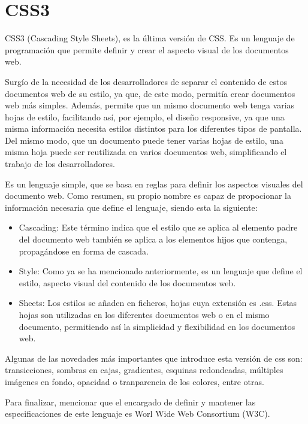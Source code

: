 \documentclass[a4paper, 12pt]{book}
\begin{document}
\section{CSS3} 
\label{sec:CSS3}

CSS3 (Cascading Style Sheets), es la última versión de CSS. Es un lenguaje de programación que permite definir y crear el aspecto visual de los documentos web. 

Surgío de la necesidad de los desarrolladores de separar el contenido de estos documentos web de su estilo, ya que, de este modo, permitía crear documentos web más simples. Además, permite que un mismo documento web tenga varias hojas de estilo, facilitando así, por ejemplo, el diseño responsive, ya que una misma información necesita estilos distintos para los diferentes tipos de pantalla. Del mismo modo, que un documento puede tener varias hojas de estilo, una misma hoja puede ser reutilizada en varios documentos web, simplificando el trabajo de los desarrolladores. 

Es un lenguaje simple, que se basa en reglas para definir los aspectos visuales del documento web. Como resumen, su propio nombre es capaz de propocionar la información necesaria que define el lenguaje, siendo esta la siguiente: 

\begin{itemize}
\item Cascading: Este término indica que el estilo que se aplica al elemento padre del documento web también se aplica a los elementos hijos que contenga, propagándose en forma de cascada. 
\item Style: Como ya se ha mencionado anteriormente, es un lenguaje que define el estilo, aspecto visual del contenido de los documentos web. 
\item Sheets: Los estilos se añaden en ficheros, hojas cuya extensión es .css. Estas hojas son utilizadas en los diferentes documentos web o en el mismo documento, permitiendo así la simplicidad y flexibilidad en los documentos web. 

\end{itemize}

Algunas de las novedades más importantes que introduce esta versión de css son: transicciones, sombras en cajas, gradientes, esquinas redondeadas, múltiples imágenes en fondo, opacidad o tranparencia de los colores, entre otras. 

Para finalizar, mencionar que el encargado de definir y mantener las especificaciones de este lenguaje es Worl Wide Web Consortium (W3C).
\end{document}
